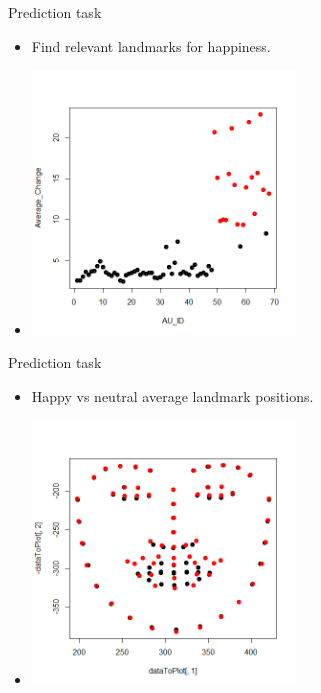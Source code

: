 \documentclass[xcolor=dvipsnames]{beamer}
\begin{document}
\begin{frame}{Prediction task}
  \begin{itemize}
    \item Find relevant landmarks for happiness.
    \item[] \includegraphics[height=7cm]{landmark_change}
  \end{itemize}
\end{frame}

\begin{frame}{Prediction task}
  \begin{itemize}
    \item Happy vs neutral average landmark positions.
    \item[] \includegraphics[height=7cm]{happy_vs_neutral}
  \end{itemize}
\end{frame}
\end{document}
